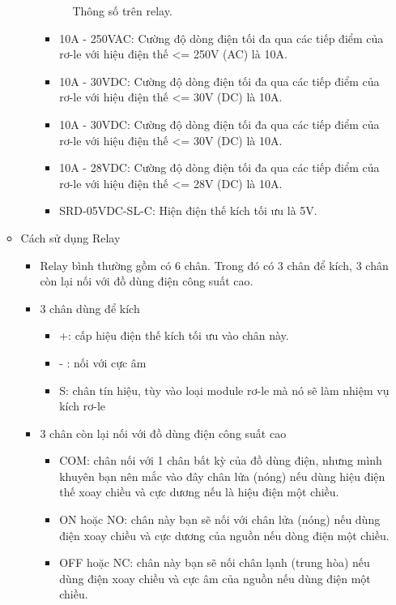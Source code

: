\documentclass[a4paper,12pt,oneside]{article}
\begin{document}
\begin{itemize}
\begin{itemize}
\begin{itemize}
\begin{figure}[H]
\begin{center}
\end{center}
\caption{Thông số trên relay.}
\end{figure}
\begin{itemize}%
\item 10A - 250VAC: Cường độ dòng điện tối đa qua các tiếp điểm của rơ-le với hiệu điện thế <= 250V (AC) là 10A.
\item 10A - 30VDC: Cường độ dòng điện tối đa qua các tiếp điểm của rơ-le với hiệu điện thế <= 30V (DC) là 10A.
\item 10A - 30VDC: Cường độ dòng điện tối đa qua các tiếp điểm của rơ-le với hiệu điện thế <= 30V (DC) là 10A.
\item 10A - 28VDC: Cường độ dòng điện tối đa qua các tiếp điểm của rơ-le với hiệu điện thế <= 28V (DC) là 10A.
\item SRD-05VDC-SL-C: Hiện điện thế kích tối ưu là 5V.
\end{itemize}%

\end{itemize}%


\item Cách sử dụng Relay
\begin{itemize}
\item Relay bình thường gồm có 6 chân. Trong đó có 3 chân để kích, 3 chân còn lại nối với đồ dùng điện công suất cao.
\item 3 chân dùng để kích
\begin{itemize}
\item +: cấp hiệu điện thế kích tối ưu vào chân này.
\item - : nối với cực âm
\item S: chân tín hiệu, tùy vào loại module rơ-le mà nó sẽ làm nhiệm vụ kích rơ-le
\end{itemize}

\item 3 chân còn lại nối với đồ dùng điện công suất cao
\begin{itemize}
\item COM: chân nối với 1 chân bất kỳ của đồ dùng điện, nhưng mình khuyên bạn nên mắc vào đây chân lửa (nóng) nếu dùng hiệu điện thế xoay chiều và cực dương nếu là hiệu điện một chiều.
\item ON hoặc NO: chân này bạn sẽ nối với chân lửa (nóng) nếu dùng điện xoay chiều và cực dương của nguồn nếu dòng điện một chiều.
\item OFF hoặc NC: chân này bạn sẽ nối chân lạnh (trung hòa) nếu dùng điện xoay chiều và cực âm của nguồn nếu dùng điện một chiều.
\end{itemize}
\end{itemize}

\end{itemize}%
\end{itemize}%
\end{document}
